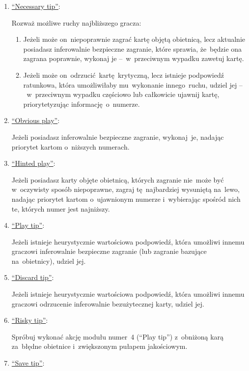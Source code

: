 \documentclass[declaration,shortabstract,inz]{iithesis}
\begin{document}
\begin{enumerate}
	\item \underline{``Necessary tip''}:

	Rozważ możliwe ruchy najbliższego gracza:
	\begin{enumerate}
		\item Jeżeli może on~niepoprawnie zagrać kartę objętą obietnicą, lecz aktualnie posiadasz inferowalnie bezpieczne zagranie, które sprawia, że~będzie ona zagrana poprawnie, wykonaj je --~w~przeciwnym wypadku zawetuj kartę.
		\item Jeżeli może on~odrzucić kartę krytyczną, lecz istnieje podpowiedź ratunkowa, która umożliwiłaby mu~wykonanie innego ruchu, udziel jej --~w~przeciwnym wypadku częściowo lub całkowicie ujawnij kartę, priorytetyzując informację o~numerze.
	\end{enumerate}

	\item \underline{``Obvious play''}:
	
	Jeżeli posiadasz inferowalnie bezpieczne zagranie, wykonaj~je, nadając priorytet kartom o~niższych numerach.
	
	\item \underline{``Hinted play''}:

	Jeżeli posiadasz karty objęte obietnicą, których zagranie nie~może być w~oczywisty sposób niepoprawne, zagraj tę~najbardziej wysuniętą na~lewo, nadając priorytet kartom o~ujawnionym numerze i~wybierając spośród nich te, których numer jest najniższy.

	\item \underline{``Play tip''}:
	
	Jeżeli istnieje heurystycznie wartościowa podpowiedź, która umożliwi innemu graczowi inferowalnie bezpieczne zagranie (lub zagranie bazujące na~obietnicy), udziel jej.

	\item \underline{``Discard tip''}:
	
	Jeżeli istnieje heurystycznie wartościowa podpowiedź, która umożliwi innemu graczowi odrzucenie inferowalnie bezużytecznej karty, udziel jej.

	\item \underline{``Risky tip''}:
	
	Spróbuj wykonać akcję modułu numer~4 (``Play tip'') z~obniżoną karą za~błędne obietnice i~zwiększonym pułapem jakościowym.
	
	\item \underline{``Save tip''}:
	

\end{enumerate}
\end{document}
